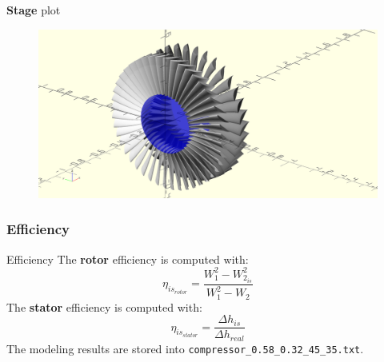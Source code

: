 	\begin{frame}{\textbf{Stage} plot}
		\begin{figure}
			\centering
			\includegraphics[width=1\textwidth]{figures/compressor.png}
		\end{figure}
	\end{frame}

\subsubsection{Efficiency}
	\begin{frame}[fragile]{Efficiency}
		The \textbf{rotor} efficiency is computed with:
		\begin{equation}
			\eta_{is_{rotor}} = \frac{W_1^2 - W_{2_{is}}^2}{W_1^2 - W_{2}} \nonumber 
		\end{equation}
		The \textbf{stator} efficiency is computed with:
		\begin{equation}
			\eta_{is_{stator}} = \frac{\Delta h_{is}}{\Delta h_{real}}
			\nonumber 
		\end{equation}
		The modeling results are stored into \verb|compressor_0.58_0.32_45_35.txt|.
	\end{frame}

